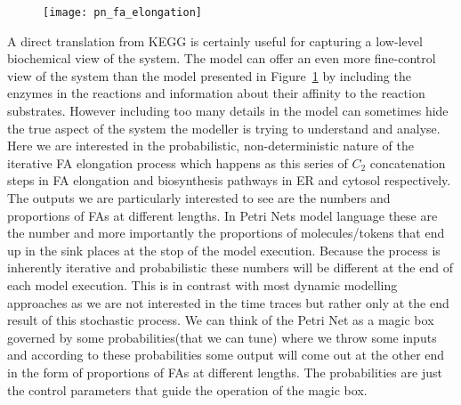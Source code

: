 \begin{figure}[htbp!]
\centering
\texttt{[image: pn\_fa\_elongation]}
\caption[FA elongation Petri Net model]{}
\label{fig:pn_fa_elongation}
\end{figure}

A direct translation from KEGG is certainly useful for capturing a
low-level biochemical view of the system. The model can offer an even
more fine-control view of the system than the model presented in
Figure~\ref{fig:pn_fa_elongation} by including the enzymes in the
reactions and information about their affinity to the reaction
substrates. However including too many details in the model can
sometimes hide the true aspect of the system the modeller is trying to
understand and analyse. Here we are interested in the probabilistic,
non-deterministic nature of the iterative FA elongation process which
happens as this series of $C_2$ concatenation steps in FA elongation
and biosynthesis pathways in ER and cytosol respectively. The outputs
we are particularly interested to see are the numbers and proportions of FAs at
different lengths. In Petri Nets model language these are the number
and more importantly the proportions
of molecules/tokens that end up in the sink places at the stop of the model
execution. Because the process is inherently iterative and
probabilistic these numbers will be different at the end of each model
execution. This is in contrast with most dynamic modelling approaches
as we are not interested in the time traces but rather only at the end
result of this stochastic process. We can think of the Petri Net as a
magic box governed by some probabilities(that we can tune) where we
throw some inputs and according to these probabilities some output
will come out at the other end in the form of proportions of FAs at different
lengths. The probabilities are just the control parameters that guide
the operation of the magic box.


